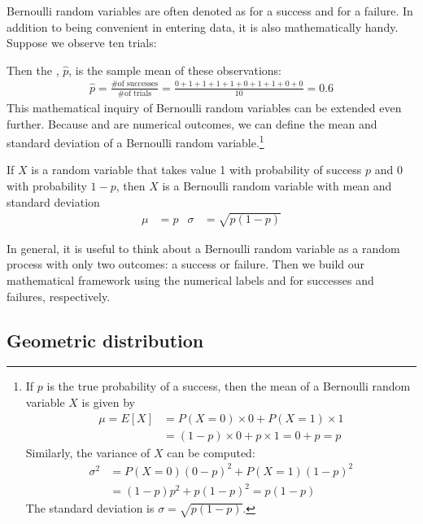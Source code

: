 Bernoulli random variables are often denoted as  for a success and  for a failure. In addition to being convenient in entering data, it is also mathematically handy. Suppose we observe ten trials:
\begin{center}
         
\end{center}
Then the , $\hat{p}$, is the sample mean of these observations:
\begin{eqnarray*}
\hat{p} = \frac{\text{\# of successes}}{\text{\# of trials}} = \frac{0+1+1+1+1+0+1+1+0+0}{10} = 0.6
\end{eqnarray*}%
This mathematical inquiry of Bernoulli random variables can be extended even further. Because  and  are numerical outcomes, we can define the {mean} and {standard deviation} of a Bernoulli random variable.\footnote{If ${p}$ is the true probability of a success, then the mean of a Bernoulli random variable $X$ is given by
\begin{align*}
\mu = E[X] &= P(X=0)\times0 + P(X=1)\times1 \\
	&= (1-p)\times0 + p\times 1 = 0+p = p
\end{align*}
Similarly, the variance of $X$ can be computed:
\begin{align*}
\sigma^2 &= {P(X=0)(0-p)^2 + P(X=1)(1-p)^2} \\
	&= {(1-p)p^2 + p(1-p)^2} = {p(1-p)}
\end{align*}
The standard deviation is $\sigma=\sqrt{p(1-p)}$.}

\begin{termBox}{
If $X$ is a random variable that takes value 1 with probability of success $p$ and 0 with probability $1-p$, then $X$ is a Bernoulli random variable with mean and standard deviation
\begin{align*}
\mu &= p
	&\sigma&= \sqrt{p(1-p)}
\end{align*}}
\end{termBox}

In general, it is useful to think about a Bernoulli random variable as a random process with only two outcomes: a success or failure. Then we build our mathematical framework using the numerical labels  and  for successes and failures, respectively.


\subsection{Geometric distribution}

